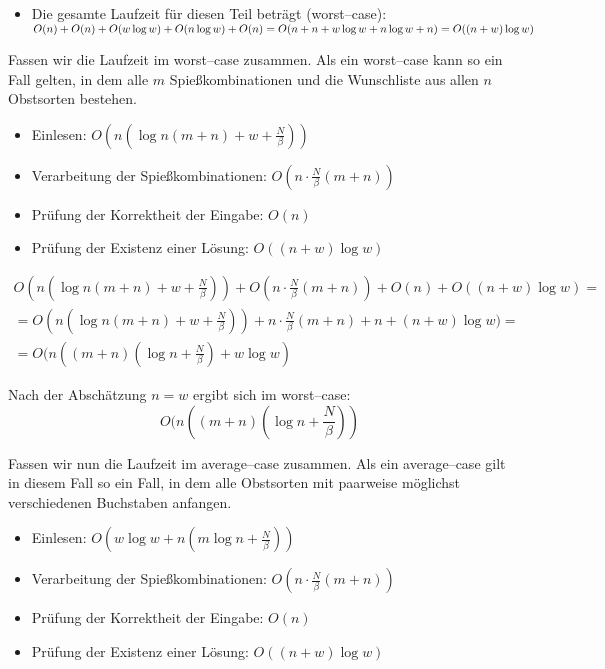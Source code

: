 \begin{itemize}
\begin{itemize}

    \item Die gesamte Laufzeit für diesen Teil beträgt (worst--case):
    $O(n) + O(n) + O(w \log w) + O(n \log w)\break + O(n)
    = O(n + n + w \log w + n \log w + n)
    = O((n + w)\log w)$
  \end{itemize}

\end{itemize}

Fassen wir die Laufzeit im worst--case zusammen. Als ein worst--case kann so ein Fall gelten,
in dem alle $m$ Spießkombinationen und die Wunschliste aus allen $n$ Obstsorten bestehen. 
\begin{itemize}
  \item Einlesen: $O(n(\log n(m + n) + w + \frac{N}{\beta}))$
  \item Verarbeitung der Spießkombinationen: $O(n\cdot \frac{N}{\beta}(m + n))$
  \item Prüfung der Korrektheit der Eingabe: $O(n)$
  \item Prüfung der Existenz einer Lösung: $O((n + w)\log w)$
\end{itemize}

\begin{equation*}
\begin{gathered}
O(n(\log n(m + n) + w + \frac{N}{\beta})) +O(n\cdot \frac{N}{\beta}(m + n)) + O(n) + O((n + w)\log w) =\\ 
= O(n(\log n(m + n) + w + \frac{N}{\beta})) + n\cdot \frac{N}{\beta}(m + n)+ n + (n + w)\log w) = \\
= O(n((m + n)(\log n + \frac{N}{\beta}) + w \log w)
\end{gathered}
\end{equation*}

Nach der Abschätzung $n = w$ ergibt sich im worst--case:
\[
O(n((m + n)(\log n + \frac{N}{\beta}))
\]

Fassen wir nun die Laufzeit im average--case zusammen. Als ein average--case gilt in diesem
Fall so ein Fall, in dem alle Obstsorten mit paarweise möglichst verschiedenen Buchstaben anfangen. 
\begin{itemize}
  \item Einlesen: $O(w \log w + n (m \log n + \frac{N}{\beta}))$
  \item Verarbeitung der Spießkombinationen: $O(n\cdot \frac{N}{\beta}(m + n))$
  \item Prüfung der Korrektheit der Eingabe: $O(n)$
  \item Prüfung der Existenz einer Lösung: $O((n + w)\log w)$
\end{itemize}

